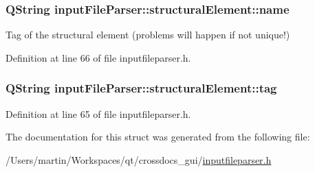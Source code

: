 \hypertarget{structinput_file_parser_1_1structural_element_a581746e08e40647fa26ee7c783e1f651}{
\subsubsection[{name}]{\setlength{\rightskip}{0pt plus 5cm}Q\+String input\+File\+Parser\+::structural\+Element\+::name}}\label{structinput_file_parser_1_1structural_element_a581746e08e40647fa26ee7c783e1f651}


Tag of the structural element (problems will happen if not unique!) 



Definition at line 66 of file inputfileparser.\+h.

\hypertarget{structinput_file_parser_1_1structural_element_a7e471738baf1165d492ab43205c9aedc}{
\subsubsection[{tag}]{\setlength{\rightskip}{0pt plus 5cm}Q\+String input\+File\+Parser\+::structural\+Element\+::tag}}\label{structinput_file_parser_1_1structural_element_a7e471738baf1165d492ab43205c9aedc}


Definition at line 65 of file inputfileparser.\+h.



The documentation for this struct was generated from the following file\+:\begin{DoxyCompactItemize}
\item 
/\+Users/martin/\+Workspaces/qt/crossdocs\+\_\+gui/\hyperlink{inputfileparser_8h}{inputfileparser.\+h}\end{DoxyCompactItemize}
